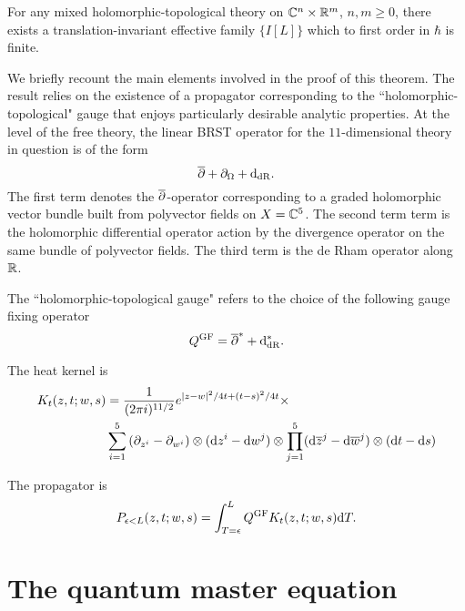 \documentclass[11pt]{amsart}
\begin{document}

\begin{thm} \label{thm:oneloop}
For any mixed holomorphic-topological theory on $\mathbb C^n \times \mathbb R^m$, $n,m \geq 0$, there exists 
a translation-invariant effective family $\{I[L]\}$ which to first order in $\hbar$ is finite. 
\end{thm}

We briefly recount the main elements involved in the proof of this theorem. 
The result relies on the existence of a propagator corresponding to the ``holomorphic-topological" gauge that enjoys particularly desirable analytic properties. 
At the level of the free theory, the linear BRST operator for the $11$-dimensional theory in question is of the form 
\[
\overline{\partial} + \partial_\Omega + {\rm d}_{\rm dR} .
\]
The first term denotes the $\overline{\partial}$-operator corresponding to a graded holomorphic vector bundle built from polyvector fields on $X = \mathbb C^5$. 
The second term term is the holomorphic differential operator action by the divergence operator on the same bundle of polyvector fields. 
The third term is the de Rham operator along $\mathbb R$. 

The ``holomorphic-topological gauge" refers to the choice of the following gauge fixing operator
\[
Q^{\rm GF} = \overline{\partial}^* + {\rm d}_{\rm dR}^* .
\]

The heat kernel is
\begin{align*}
K_{t} (z, t ; w , s) & = \frac{1}{(2\pi i)^{11/2}} e^{|z-w|^2/4t + (t-s)^2/4t} \times \\
& \sum_{i=1}^5 \left(\partial_{z^i} - \partial_{w^i} \right) \otimes ({\rm d} z^i - {\rm d} w^j) \otimes \prod_{j=1}^5 ({\rm d} \overline{z}^j - {\rm d} \overline{w}^j) \otimes ({\rm d} t - {\rm d} s)
\end{align*}

The propagator is
\[
P_{\epsilon < L} (z, t ; w , s) = \int_{T=\epsilon}^L Q^{\rm GF} K_{t} (z, t ; w , s) {\rm d} T .
\]

\section{The quantum master equation} 
\end{document}
